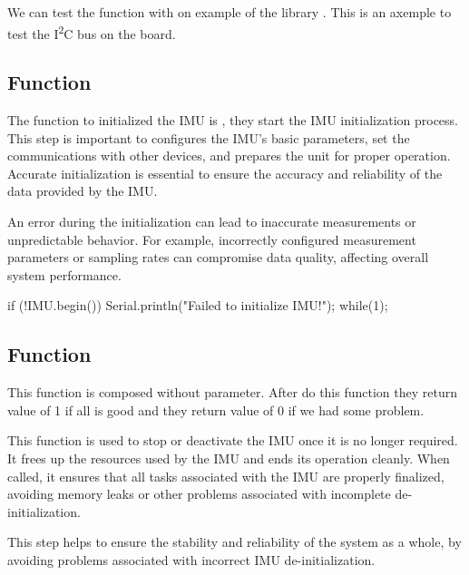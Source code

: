 We can test the function with on example of the library . This is an axemple to test the I\textsuperscript{2}C bus on the board. 
\begin{center}
    
    \label{TestWire}
    
\end{center}
\subsection{Function }


The function to initialized the IMU is , they start the IMU initialization process. This step is important to configures the IMU's basic parameters, set the communications with other devices, and prepares the unit for proper operation. Accurate initialization is essential to ensure the accuracy and reliability of the data provided by the IMU.

An error during the initialization can lead to inaccurate measurements or unpredictable behavior. For example, incorrectly configured measurement parameters or sampling rates can compromise data quality, affecting overall system performance.


\begin{Arduino}
    if (!IMU.begin()) {
        Serial.println("Failed to initialize IMU!");
        while(1){};	}
\end{Arduino}


\subsection{Function } 

This function is composed without parameter. After do this function they return value of 1 if all is good and they return value of 0 if we had some problem.

This function is used to stop or deactivate the IMU once it is no longer required. It frees up the resources used by the IMU and ends its operation cleanly. When called, it ensures that all tasks associated with the IMU are properly finalized, avoiding memory leaks or other problems associated with incomplete de-initialization.

This step helps to ensure the stability and reliability of the system as a whole, by avoiding problems associated with incorrect IMU de-initialization.

